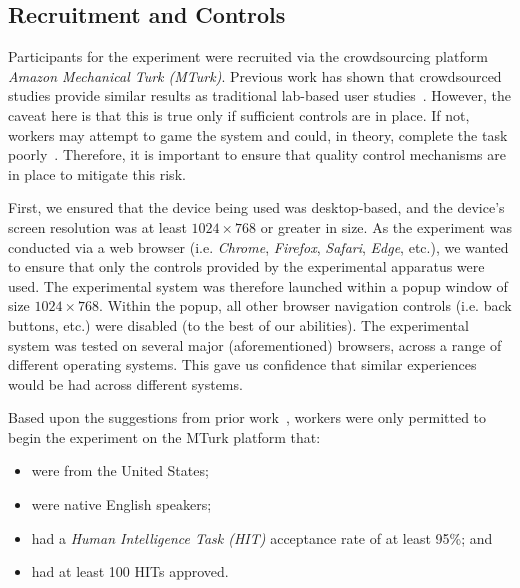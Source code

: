 

\subsection{Recruitment and Controls}\label{sec:method:subjects}
Participants for the experiment were recruited via the crowdsourcing platform \emph{Amazon Mechanical Turk (MTurk)}. Previous work has shown that crowdsourced studies provide similar results as traditional lab-based user studies~\cite{kelly2011remote,zuccon2013crowdsourcing}. However, the caveat here is that this is true only if sufficient controls are in place. If not, workers may attempt to game the system and could, in theory, complete the task poorly~\cite{feild2010turkers}. Therefore, it is important to ensure that quality control mechanisms are in place to mitigate this risk.

First, we ensured that the device being used was desktop-based, and the device's screen resolution was at least $1024 \times 768$ or greater in size. As the experiment was conducted via a web browser (i.e. \emph{Chrome}, \emph{Firefox}, \emph{Safari}, \emph{Edge}, etc.), we wanted to ensure that only the controls provided by the experimental apparatus were used. The experimental system was therefore launched within a popup window of size $1024 \times 768$. Within the popup, all other browser navigation controls (i.e. back buttons, etc.) were disabled (to the best of our abilities). The experimental system was tested on several major (aforementioned) browsers, across a range of different operating systems. This gave us confidence that similar experiences would be had across different systems.

Based upon the suggestions from prior work~\cite{feild2010turkers,zuccon2013crowdsourcing}, workers were only permitted to begin the experiment on the MTurk platform that:

\begin{itemize}
\item were from the United States;
\item were native English speakers;
\item had a \emph{Human Intelligence Task (HIT)} acceptance rate of at least 95\%; and 
\item had at least 100 HITs approved.
\end{itemize}

